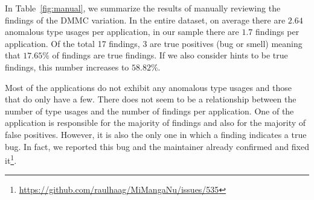 \begin{table}[t]
    \centering
    \caption{The results of the manual evaluation}\label{fig:manual}
\end{table}

In Table~\ref{fig:manual}, we summarize the results of manually reviewing the findings of the $\text{DMMC}$ variation.
In the entire dataset, on average there are $2.64$ anomalous type usages per application, in our sample there are $1.7$ findings per application.
Of the total 17 findings, 3 are true positives (bug or smell) meaning that $17.65\%$ of findings are true findings.
If we also consider hints to be true findings, this number increases to $58.82\%$.

Most of the applications do not exhibit any anomalous type usages and those that do only have a few.
There does not seem to be a relationship between the number of type usages and the number of findings per application.
One of the application is responsible for the majority of findings and also for the majority of false positives.
However, it is also the only one in which a finding indicates a true bug.
In fact, we reported this bug and the maintainer already confirmed and fixed it\footnote{\url{https://github.com/raulhaag/MiMangaNu/issues/535}}.


